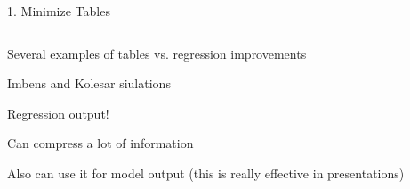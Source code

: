 \documentclass[notes,11pt, aspectratio=169]{beamer}
\newenvironment{wideitemize}{\itemize\addtolength{\itemsep}{10pt}}{\enditemize}
\begin{document}
\begin{frame}{1. Minimize Tables}
  \begin{columns}[T] %
    \begin{column}{.5\textwidth}
      \begin{wideitemize}
      \item<1-> Several examples of tables vs. regression improvements
      \item<1-> Imbens and Kolesar siulations
      \item<2-> Regression output!
      \item<3-> Can compress a lot of information
      \item<4-> Also can use it for model output  (this is really effective in presentations)
      \end{wideitemize}
  \end{column}%
  \hfill%
  \begin{column}{.5\textwidth}
  \end{column}
\end{columns}
\end{frame}
\end{document}
